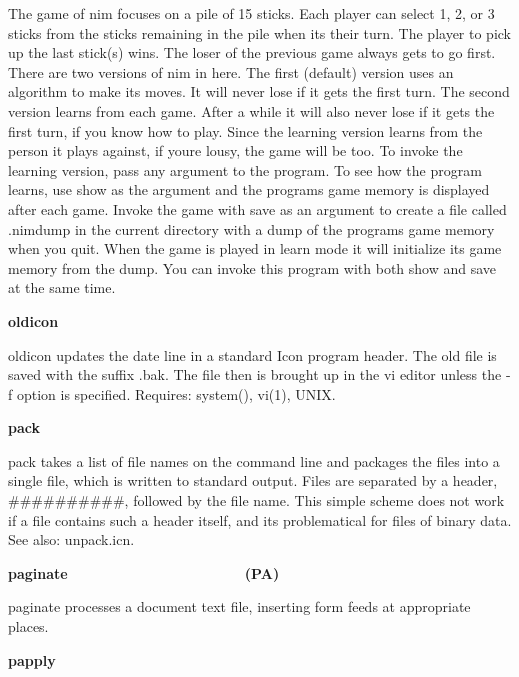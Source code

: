 {The game of \textsf{nim} focuses on a pile of 15 sticks. Each player can
select 1, 2, or 3 sticks from the sticks remaining in the pile when
it{\textquotesingle}s their turn. The player to pick up the last
stick(s) wins. The loser of the previous game always gets to go first.
There are two versions of nim in here. The first (default) version uses
an algorithm to make its moves. It will never lose if it gets the first
turn. The second version learns from each game. After a while it will
also never lose if it gets the first turn, if you know how to play.
Since the learning version learns from the person it plays against, if
you{\textquotesingle}re lousy, the game will be too. To invoke the
learning version, pass any argument to the program. To see how the
program learns, use \textsf{show} as the argument and the
program{\textquotesingle}s game memory is displayed after each game.
Invoke the game with \textsf{save} as an argument to create a file
called {\textquotedbl}.nimdump{\textquotedbl} in the current directory
with a dump of the program{\textquotesingle}s game memory when you
quit. When the game is played in learn mode it will initialize its game
memory from the dump. You can invoke this program with both
\textsf{show} and \textsf{save} at the same time.

{\sffamily\bfseries
oldicon\ \ \ \ \ \ \ \ \ \ \ \ \ \ \ \ \ \ \ \ }

\textsf{oldicon} updates the date line in a standard Icon program
header. The old file is saved with the suffix \textsf{.bak}. The file
then is brought up in the vi editor unless the
\textsf{{}-f} option is specified. Requires: \textsf{system()},
\textsf{vi(1)}, UNIX.

{\sffamily\bfseries
pack\ \ \ \ \ \ \ \ \ \ \ \ \ \ \ \ \ \ \ \ \ \ }

\textsf{pack} takes a list of file names on the command line and
packages the files into a single file, which is written to standard
output. Files are separated by a header, \#\#\#\#\#\#\#\#\#\#, followed
by the file name. This simple scheme does not work if a file contains
such a header itself, and it{\textquotesingle}s problematical for files
of binary data. See also: \textsf{unpack.icn}.

{\sffamily\bfseries
paginate\ \ \ \ \ \ \ \ \ \ \ \ \ \ \ \ \ \ \ \  \ \ (PA)}

\textsf{paginate} processes a document text file, inserting form feeds at appropriate places. 

{\sffamily\bfseries
papply\ \ \ \ \ \ \ \ \ \ \ \ \ \ \ \ \ \ \ \ }

}
